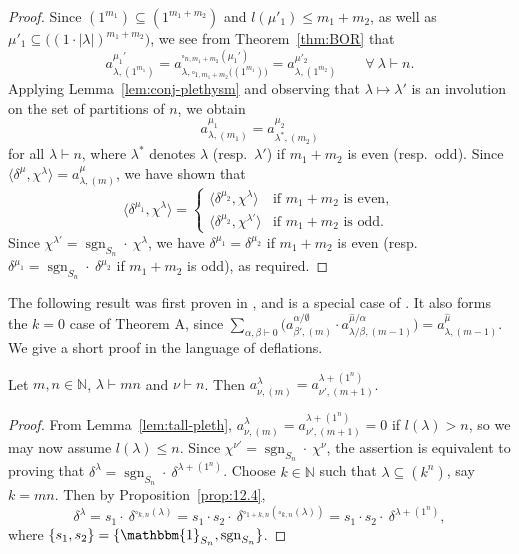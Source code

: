 \documentclass[ALCO, Unicode]{cedram}
\newcommand{\triv}{\mathbbm{1}}
\newcommand{\sgn}{\operatorname{sgn}}
\newcommand{\N}{\mathbb{N}}
\begin{document}
\begin{proof}
	Since $(1^{m_1})\subseteq(1^{m_1+m_2})$ and $l(\mu'_1)\le m_1+m_2$, as well as $\mu'_1\subseteq \big((1\cdot|\lambda|)^{m_1+m_2}\big)$, we see from Theorem~\ref{thm:BOR} that
	\[ a^{\mu_1'}_{\lambda,(1^{m_1})} = a^{\square_{n,m_1+m_2}(\mu_1')}_{\lambda,\square_{1,m_1+m_2}\big((1^{m_1})\big)} = a^{\mu'_2}_{\lambda,(1^{m_2})}\qquad\forall\ \lambda\vdash n. \]
	Applying Lemma~\ref{lem:conj-plethysm} and observing that $\lambda\mapsto\lambda'$ is an involution on the set of partitions of $n$, we obtain
	\[ a^{\mu_1}_{\lambda,(m_1)} = a^{\mu_2}_{\lambda^\ast,(m_2)} \]
	for all $\lambda\vdash n$, where $\lambda^\ast$ denotes $\lambda$ (resp.~$\lambda'$) if $m_1+m_2$ is even (resp.~odd). 
	Since $\langle \delta^\mu, \chi^\lambda\rangle = a^\mu_{\lambda,(m)}$, we have shown that
	\[ \langle \delta^{\mu_1},\chi^\lambda\rangle = \begin{cases}
		\langle \delta^{\mu_2},\chi^\lambda\rangle & \text{if $m_1+m_2$ is even},\\ \langle \delta^{\mu_2}, \chi^{\lambda'}\rangle & \text{if $m_1+m_2$ is odd}.\end{cases} \]
	Since $\chi^{\lambda'}=\sgn_{S_n}\cdot\ \chi^\lambda$, we have $\delta^{\mu_1}=\delta^{\mu_2}$ if $m_1+m_2$ is even (resp.~$\delta^{\mu_1}=\sgn_{S_n}\cdot\ \delta^{\mu_2}$ if $m_1+m_2$ is odd), as required.
\end{proof}

The following result was first proven in \cite[Proposition 1.16]{BCV}, and is a special case of \cite[Theorem 1.1]{dBPW}. It also forms the $k=0$ case of Theorem A, since $\sum_{\alpha,\beta\vdash 0} \big(a^{\alpha/\emptyset}_{\beta',(m)}\cdot a^{\hat{\mu}/\alpha}_{\lambda/\beta,(m-1)}\big) = a^{\hat{\mu}}_{\lambda,(m-1)}$. We give a short proof in the language of deflations.

\begin{theorem}\label{thm:4.4.3}
	Let $m,n\in\N$, $\lambda\vdash mn$ and $\nu\vdash n$. Then $a^\lambda_{\nu,(m)} = a^{\lambda+(1^n)}_{\nu',(m+1)}$.
\end{theorem}

\begin{proof}
	From Lemma~\ref{lem:tall-pleth}, $a^\lambda_{\nu,(m)} = a^{\lambda+(1^n)}_{\nu',(m+1)}=0$ if $l(\lambda)>n$, so we may now assume $l(\lambda)\le n$. 
	Since $\chi^{\nu'}=\sgn_{S_n}\cdot\ \chi^\nu$, the assertion is equivalent to proving that $\delta^\lambda=\sgn_{S_n}\cdot\ \delta^{\lambda+(1^n)}$. 
	Choose $k\in\N$ such that $\lambda\subseteq(k^n)$, say $k=mn$. Then by Proposition~\ref{prop:12.4},
	\[ \delta^\lambda =s_1\cdot \ \delta^{\square_{k,n}(\lambda)} = s_1\cdot s_2\cdot\ \delta^{\square_{1+k,n}(\square_{k,n}(\lambda))} = s_1\cdot s_2\cdot\ \delta^{\lambda+(1^n)}, \]
	where $\{s_1,s_2\}=\{\triv_{S_n},\sgn_{S_n}\}$.
\end{proof}
\end{document}
